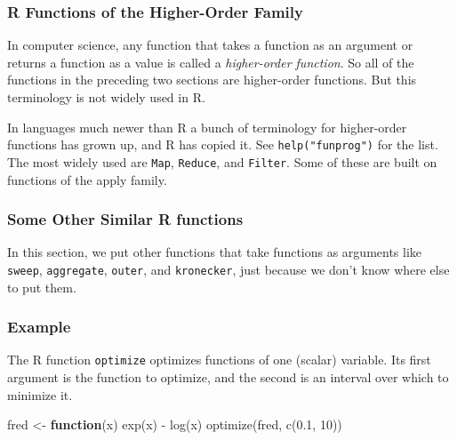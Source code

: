 \documentclass[
]{article}
\newenvironment{Shaded}{\begin{snugshade}}{\end{snugshade}}
\newcommand{\ControlFlowTok}[1]{\textcolor[rgb]{0.13,0.29,0.53}{\textbf{#1}}}
\newcommand{\DecValTok}[1]{\textcolor[rgb]{0.00,0.00,0.81}{#1}}
\newcommand{\FloatTok}[1]{\textcolor[rgb]{0.00,0.00,0.81}{#1}}
\newcommand{\FunctionTok}[1]{\textcolor[rgb]{0.00,0.00,0.00}{#1}}
\newcommand{\NormalTok}[1]{#1}
\newcommand{\OtherTok}[1]{\textcolor[rgb]{0.56,0.35,0.01}{#1}}
\newcommand{\SpecialCharTok}[1]{\textcolor[rgb]{0.00,0.00,0.00}{#1}}
\begin{document}
\hypertarget{r-functions-of-the-higher-order-family}{%
\subsubsection{R Functions of the Higher-Order
Family}\label{r-functions-of-the-higher-order-family}}

In computer science, any function that takes a function as an argument
or returns a function as a value is called a \emph{higher-order
function}. So all of the functions in the preceding two sections are
higher-order functions. But this terminology is not widely used in R.

In languages much newer than R a bunch of terminology for higher-order
functions has grown up, and R has copied it. See
\texttt{help("funprog")} for the list. The most widely used are
\texttt{Map}, \texttt{Reduce}, and \texttt{Filter}. Some of these are
built on functions of the apply family.

\hypertarget{some-other-similar-r-functions}{%
\subsubsection{Some Other Similar R
functions}\label{some-other-similar-r-functions}}

In this section, we put other functions that take functions as arguments
like \texttt{sweep}, \texttt{aggregate}, \texttt{outer}, and
\texttt{kronecker}, just because we don't know where else to put them.

\hypertarget{example}{%
\subsubsection{Example}\label{example}}

The R function \texttt{optimize} optimizes functions of one (scalar)
variable. Its first argument is the function to optimize, and the second
is an interval over which to minimize it.

\begin{Shaded}
\begin{Highlighting}[]
\NormalTok{fred }\OtherTok{\textless{}{-}} \ControlFlowTok{function}\NormalTok{(x) }\FunctionTok{exp}\NormalTok{(x) }\SpecialCharTok{{-}} \FunctionTok{log}\NormalTok{(x)}
\FunctionTok{optimize}\NormalTok{(fred, }\FunctionTok{c}\NormalTok{(}\FloatTok{0.1}\NormalTok{, }\DecValTok{10}\NormalTok{))}
\end{Highlighting}
\end{Shaded}
\end{document}
